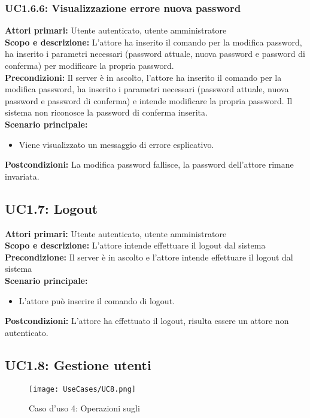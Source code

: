 \documentclass{scalatekids-article}
\begin{document}
\subsubsection{UC1.6.6: Visualizzazione errore nuova password}

\textbf{Attori primari:} Utente autenticato, utente amministratore\\
\textbf{Scopo e descrizione:}
L'attore ha inserito il comando per la modifica password, ha inserito i parametri necessari (password attuale, nuova password e password di conferma) per modificare la propria password.\\
\textbf{Precondizioni:} Il server è in ascolto, l'attore ha inserito il comando per la modifica password, ha inserito i parametri necessari (password attuale, nuova password e password di conferma) e intende modificare la propria password. Il sistema non riconosce la password di conferma inserita.\\
\textbf{Scenario principale:}
\begin{itemize}
\item Viene visualizzato un messaggio di errore esplicativo.
\end{itemize}
\textbf{Postcondizioni:} La modifica password fallisce, la password dell'attore rimane invariata.

\subsection{UC1.7: Logout}

\textbf{Attori primari:} Utente autenticato, utente amministratore\\
\textbf{Scopo e descrizione:} L'attore intende effettuare il logout dal sistema\\
\textbf{Precondizione:} Il server è in ascolto e l'attore intende effettuare il logout dal sistema\\
\textbf{Scenario principale:}
\begin{itemize}
\item L'attore può inserire il comando di logout.
\end{itemize}
\textbf{Postcondizioni:} L'attore ha effettuato il logout, risulta essere un attore non autenticato.

\subsection{UC1.8: Gestione utenti}

\begin{figure}[H]
  \begin{center}
    \texttt{[image: UseCases/UC8.png]}
    \caption*{Caso d'uso 4: Operazioni sugli }
  \end{center}
\end{figure}
\end{document}
